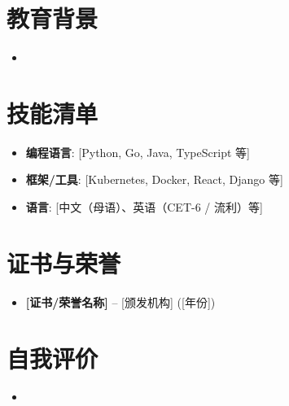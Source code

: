 \documentclass[11pt,a4paper,sans]{moderncv}
\begin{document}

\section{教育背景}
\vspace{1pt}
\begin{itemize}
\item{}
\end{itemize}


\section{技能清单}
\vspace{1pt}
\begin{itemize}
\item \textbf{编程语言}: [Python, Go, Java, TypeScript 等]
\item \textbf{框架/工具}: [Kubernetes, Docker, React, Django 等]
\item \textbf{语言}: [中文（母语）、英语（CET-6 / 流利）等]
\end{itemize}


\section{证书与荣誉}
\vspace{1pt}
\begin{itemize}
\item{\textbf{[证书/荣誉名称]} -- [颁发机构] ([年份])}
\end{itemize}


\section{自我评价}
\vspace{1pt}
\begin{itemize}
\item [1-2 句话总结工作风格、职业素养或核心驱动力]
\end{itemize}
\end{document}
